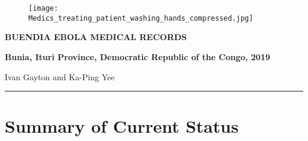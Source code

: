 \documentclass[a4paper,12pt,twoside]{article}
\begin{document}
\thispagestyle{empty}


\begin{figure}[t!]
\centering
\texttt{[image: Medics\_treating\_patient\_washing\_hands\_compressed.jpg]}
\end{figure}

\begin{center}
  \huge \color{RHblue} \textbf {BUENDIA EBOLA MEDICAL RECORDS}

\textbf{Bunia, Ituri Province, Democratic Republic of the Congo, 2019}
\end{center}
\medskip


\begin{center}
  Ivan Gayton and Ka-Ping Yee
  \
  
\end{center}
\medskip
\begin{center}
\color{RHblue}\rule{\textwidth}{0.5cm}
\end{center}

\newpage
\newpage


\tableofcontents

\newpage
\section{Summary of Current Status}
\end{document}
